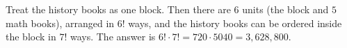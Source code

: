 Treat the history books as one block. Then there are $6$ units (the block and $5$ math books), arranged in $6!$ ways, and the history books can be ordered inside the block in $7!$ ways. The answer is $6!\cdot7!=720\cdot5040=\boxed{3{,}628{,}800}$.

